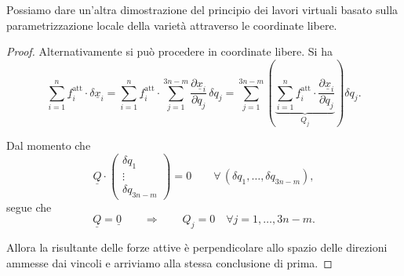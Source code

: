 Possiamo dare un'altra dimostrazione del principio dei lavori virtuali basato sulla parametrizzazione locale della varietà attraverso le coordinate libere.
\begin{proof}
Alternativamente si può procedere in coordinate libere. Si ha
\[
\sum_{i=1}^{n} \underline{f}_i^{\mathrm{att}}\cdot \delta \underline{x}_i
=
\sum_{i=1}^{n} \underline{f}_i^{\mathrm{att}}\cdot
\sum_{j=1}^{3n-m}
\frac{\partial \underline{x}_i}{\partial q_j}\,\delta q_j
=
\sum_{j=1}^{3n-m}
\left(
\underbrace{
\sum_{i=1}^{n}
\underline{f}_i^{\mathrm{att}}\cdot
\frac{\partial \underline{x}_i}{\partial q_j}
}_{Q_j}
\right)
\delta q_j.
\]

Dal momento che
\[
\underline{Q}\cdot
\begin{pmatrix}
\delta q_1\\
\vdots\\
\delta q_{3n-m}
\end{pmatrix}
=0
\qquad
\forall\,(\delta q_1,\dots,\delta q_{3n-m}),
\]
segue che
\[
\underline{Q}=\underline{0}
\qquad \Longrightarrow \qquad
Q_j=0
\quad
\forall j=1,\dots,3n-m.
\]

Allora la risultante delle forze attive è perpendicolare allo spazio delle direzioni ammesse dai vincoli e arriviamo alla stessa conclusione di prima.
\end{proof}

